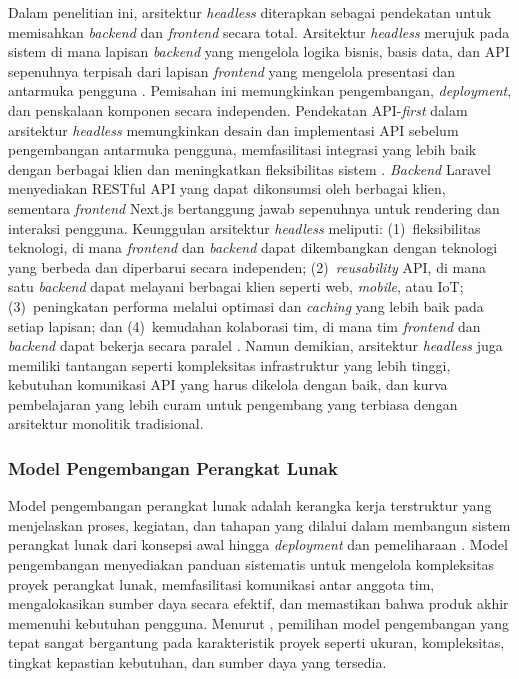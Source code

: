 Dalam penelitian ini, arsitektur \textit{headless} diterapkan sebagai pendekatan untuk memisahkan \textit{backend} dan \textit{frontend} secara total. Arsitektur \textit{headless} merujuk pada sistem di mana lapisan \textit{backend} yang mengelola logika bisnis, basis data, dan API sepenuhnya terpisah dari lapisan \textit{frontend} yang mengelola presentasi dan antarmuka pengguna \citep{Hassan_2024_HeadlessCMSPerformance}. Pemisahan ini memungkinkan pengembangan, \textit{deployment}, dan penskalaan komponen secara independen. Pendekatan API-\textit{first} dalam arsitektur \textit{headless} memungkinkan desain dan implementasi API sebelum pengembangan antarmuka pengguna, memfasilitasi integrasi yang lebih baik dengan berbagai klien dan meningkatkan fleksibilitas sistem \citep{Velepucha_2023_MicroservicesSurvey}. \textit{Backend} Laravel menyediakan RESTful API yang dapat dikonsumsi oleh berbagai klien, sementara \textit{frontend} Next.js bertanggung jawab sepenuhnya untuk rendering dan interaksi pengguna. Keunggulan arsitektur \textit{headless} meliputi: (1)~fleksibilitas teknologi, di mana \textit{frontend} dan \textit{backend} dapat dikembangkan dengan teknologi yang berbeda dan diperbarui secara independen; (2)~\textit{reusability} API, di mana satu \textit{backend} dapat melayani berbagai klien seperti web, \textit{mobile}, atau IoT; (3)~peningkatan performa melalui optimasi dan \textit{caching} yang lebih baik pada setiap lapisan; dan (4)~kemudahan kolaborasi tim, di mana tim \textit{frontend} dan \textit{backend} dapat bekerja secara paralel \citep{Strapi_2026_Headless}. Namun demikian, arsitektur \textit{headless} juga memiliki tantangan seperti kompleksitas infrastruktur yang lebih tinggi, kebutuhan komunikasi API yang harus dikelola dengan baik, dan kurva pembelajaran yang lebih curam untuk pengembang yang terbiasa dengan arsitektur monolitik tradisional.

\subsubsection{Model Pengembangan Perangkat Lunak}

Model pengembangan perangkat lunak adalah kerangka kerja terstruktur yang menjelaskan proses, kegiatan, dan tahapan yang dilalui dalam membangun sistem perangkat lunak dari konsepsi awal hingga \textit{deployment} dan pemeliharaan \citep{Sommerville_2016_SE}. Model pengembangan menyediakan panduan sistematis untuk mengelola kompleksitas proyek perangkat lunak, memfasilitasi komunikasi antar anggota tim, mengalokasikan sumber daya secara efektif, dan memastikan bahwa produk akhir memenuhi kebutuhan pengguna. Menurut \citet{Pressman_2014_SE}, pemilihan model pengembangan yang tepat sangat bergantung pada karakteristik proyek seperti ukuran, kompleksitas, tingkat kepastian kebutuhan, dan sumber daya yang tersedia.


